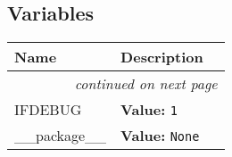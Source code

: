 
  \subsection{Variables}

    \vspace{-1cm}
\hspace{\varindent}\begin{longtable}{|p{\varnamewidth}|p{\vardescrwidth}|l}
\cline{1-2}
\cline{1-2} \centering \textbf{Name} & \centering \textbf{Description}& \\
\cline{1-2}
\endhead\cline{1-2}\multicolumn{3}{r}{\small\textit{continued on next page}}\\\endfoot\cline{1-2}
\endlastfoot\raggedright I\-F\-D\-E\-B\-U\-G\- & \raggedright \textbf{Value:} 
{\tt 1}&\\
\cline{1-2}
\raggedright \_\-\_\-p\-a\-c\-k\-a\-g\-e\-\_\-\_\- & \raggedright \textbf{Value:} 
{\tt None}&\\
\cline{1-2}
\end{longtable}

